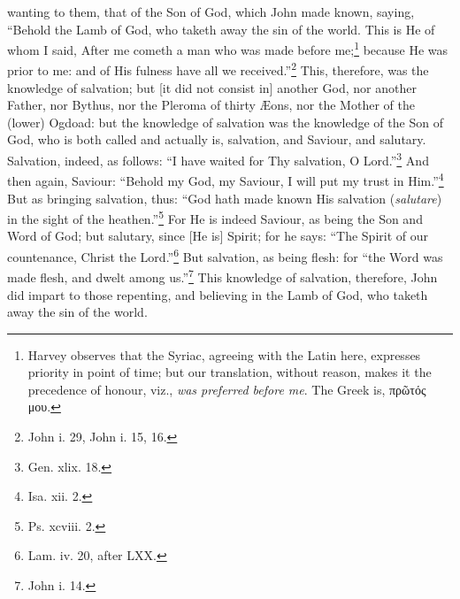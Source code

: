 wanting to them, that of the Son of God, which John made known, saying, “Behold the Lamb of God, who taketh away the sin of the world. This is He of whom I said, After me cometh a man who was made before me;\footnote{Harvey observes that the Syriac, agreeing with the Latin here, expresses priority in point of time; but our translation, without reason, makes it the precedence of honour, viz., \emph{was preferred before me}. The Greek is, \textgreek{πρῶτός μου}.} because He was prior to me: and of His fulness have all we received.”\footnote{John i. 29, John i. 15, 16.} This, therefore, was the knowledge of salvation; but [it did not consist in] another God, nor another Father, nor Bythus, nor the Pleroma of thirty Æons, nor the Mother of the (lower) Ogdoad: but the knowledge of salvation was the knowledge of the Son of God, who is both called and actually is, salvation, and Saviour, and salutary. Salvation, indeed, as follows: “I have waited for Thy salvation, O Lord.”\footnote{Gen. xlix. 18.} And then again, Saviour: “Behold my God, my Saviour, I will put my trust in Him.”\footnote{Isa. xii. 2.} But as bringing salvation, thus: “God hath made known His salvation (\emph{salutare}) in the sight of the heathen.”\footnote{Ps. xcviii. 2.} For He is indeed Saviour, as being the Son and Word of God; but salutary, since [He is] Spirit; for he says: “The Spirit of our countenance, Christ the Lord.”\footnote{Lam. iv. 20, after LXX.} But salvation, as being flesh: for “the Word was made flesh, and dwelt among us.”\footnote{John i. 14.} This knowledge of salvation, therefore, John did impart to those repenting, and believing in the Lamb of God, who taketh away the sin of the world.

